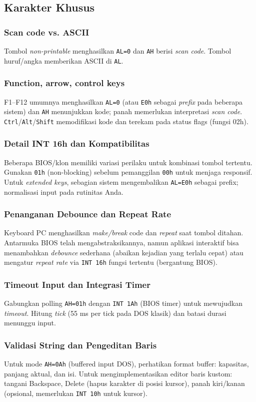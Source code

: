 \documentclass[../main.tex]{subfiles}
\begin{document}
\subsection{Karakter Khusus}
\subsubsection{Scan code vs. ASCII}
Tombol \textit{non-printable} menghasilkan \texttt{AL=0} dan \texttt{AH} berisi \textit{scan code}. Tombol huruf/angka memberikan ASCII di \texttt{AL}.

\subsubsection{Function, arrow, control keys}
F1--F12 umumnya menghasilkan \texttt{AL=0} (atau \texttt{E0h} sebagai \textit{prefix} pada beberapa sistem) dan \texttt{AH} menunjukkan kode; panah memerlukan interpretasi \textit{scan code}. \texttt{Ctrl}/\texttt{Alt}/\texttt{Shift} memodifikasi kode dan terekam pada status flags (fungsi 02h).

\subsubsection{Detail INT 16h dan Kompatibilitas}
Beberapa BIOS/klon memiliki variasi perilaku untuk kombinasi tombol tertentu. Gunakan \texttt{01h} (non-blocking) sebelum pemanggilan \texttt{00h} untuk menjaga responsif. Untuk \textit{extended keys}, sebagian sistem mengembalikan \texttt{AL=E0h} sebagai prefix; normalisasi input pada rutinitas Anda. 
\subsubsection{Penanganan Debounce dan Repeat Rate}
Keyboard PC menghasilkan \textit{make/break} code dan \textit{repeat} saat tombol ditahan. Antarmuka BIOS telah mengabstraksikannya, namun aplikasi interaktif bisa menambahkan \textit{debounce} sederhana (abaikan kejadian yang terlalu cepat) atau mengatur \textit{repeat rate} via \texttt{INT 16h} fungsi tertentu (bergantung BIOS). 
\subsubsection{Timeout Input dan Integrasi Timer}
Gabungkan polling \texttt{AH=01h} dengan \texttt{INT 1Ah} (BIOS timer) untuk mewujudkan \textit{timeout}. Hitung \textit{tick} (55 ms per tick pada DOS klasik) dan batasi durasi menunggu input. 
\subsubsection{Validasi String dan Pengeditan Baris}
Untuk mode \texttt{AH=0Ah} (buffered input DOS), perhatikan format buffer: kapasitas, panjang aktual, dan isi. Untuk mengimplementasikan editor baris kustom: tangani Backspace, Delete (hapus karakter di posisi kursor), panah kiri/kanan (opsional, memerlukan \texttt{INT 10h} untuk kursor). 
\end{document}
